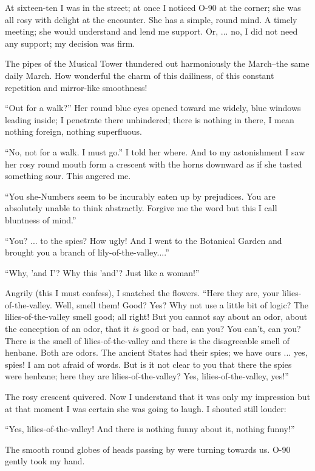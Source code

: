 \documentclass[11pt,openany]{book}
\begin{document}
At sixteen-ten I was in the street; at once I noticed O-90 at the corner; she was all rosy with delight at the encounter. She has a simple, round mind. A timely meeting; she would understand and lend me support. Or, ... no, I did not need any support; my decision was firm.

The pipes of the Musical Tower thundered out harmoniously the March--the same daily March. How wonderful the charm of this dailiness, of this constant repetition and mirror-like smoothness!

``Out for a walk?'' Her round blue eyes opened toward me widely, blue windows leading inside; I penetrate there unhindered; there is nothing in there, I mean nothing foreign, nothing superfluous.

``No, not for a walk. I must go.'' I told her where. And to my astonishment I saw her rosy round mouth form a crescent with the horns downward as if she tasted something sour. This angered me.

``You she-Numbers seem to be incurably eaten up by prejudices. You are absolutely unable to think abstractly. Forgive me the word but this I call bluntness of mind.''

``You? ... to the spies? How ugly! And I went to the Botanical Garden and brought you a branch of lily-of-the-valley....''

``Why, 'and I'? Why this 'and'? Just like a woman!''

Angrily (this I must confess), I snatched the flowers. ``Here they are, your lilies-of-the-valley. Well, smell them! Good? Yes? Why not use a little bit of logic? The lilies-of-the-valley smell good; all right! But you cannot say about an odor, about the conception of an odor, that it \emph{is} good or bad, can you? You can't, can you? There is the smell of lilies-of-the-valley and there is the disagreeable smell of henbane. Both are odors. The ancient States had their spies; we have ours ... yes, spies! I am not afraid of words. But is it not clear to you that there the spies were henbane; here they are lilies-of-the-valley? Yes, lilies-of-the-valley, yes!''

The rosy crescent quivered. Now I understand that it was only my impression but at that moment I was certain she was going to laugh. I shouted still louder:

``Yes, lilies-of-the-valley! And there is nothing funny about it, nothing funny!''

The smooth round globes of heads passing by were turning towards us. O-90 gently took my hand.
\end{document}
